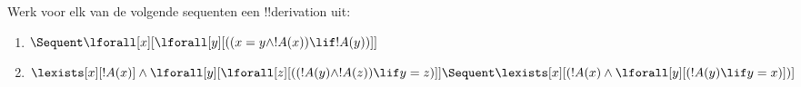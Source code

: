 \documentclass[../../../include/open-logic-section]{subfiles}
\begin{document}
\begin{prob}
Werk voor elk van de volgende sequenten een !!{derivation} uit:
\begin{enumerate}
\item $\Sequent \lforall[x][\lforall[y][((x = y \land !A(x)) \lif !A(y))]]$
\item $\lexists[x][!A(x)] \land \lforall[y][\lforall[z][((!A(y) \land
    !A(z)) \lif y = z)]] \Sequent 
\lexists[x][(!A(x) \land \lforall[y][(!A(y) \lif y = x)])]$
\end{enumerate}
\end{prob}
\end{document}
